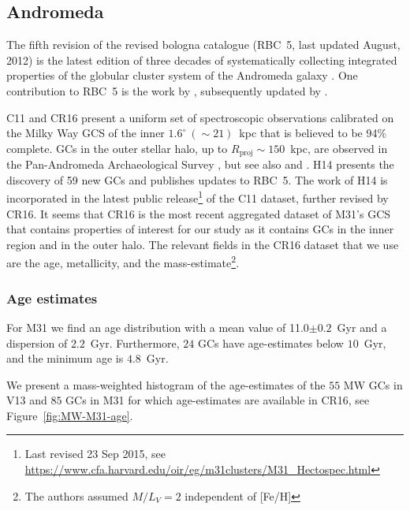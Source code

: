 \documentclass[a4paper,fleqn,usenatbib]{mnras}
\begin{document}
\subsection{Andromeda}
\label{sec:andromeda}
The fifth revision of the revised bologna catalogue (RBC~5, last updated
August, 2012) is the latest edition of three decades of systematically
collecting integrated properties of the globular cluster system of the
Andromeda galaxy \citep[][and references therein]{2004A&A...416..917G}. One
contribution to RBC~5 is the work by \citet[][hereafter C11]{2011AJ....141...61C},
subsequently updated by \citet[][hereafter CR16]{2016ApJ...824...42C}.

C11 and CR16 present a uniform set of spectroscopic observations calibrated
on the Milky Way GCS of the inner $1.6^\circ~(\sim21)$~kpc that
is believed to be 94\% complete. GCs in the outer stellar halo, up to
$R_{\text{proj}}\sim150$~kpc, are observed in the Pan-Andromeda Archaeological
Survey \citep[PAndAS, ][hereafter H14]{2014MNRAS.442.2165H}, but see also
\citet{2014MNRAS.442.2929V} and \citet{2019MNRAS.484.1756M}. H14 presents the
discovery of 59 new GCs and publishes updates to RBC~5. The work of H14 is
incorporated in the latest public release\footnote{Last revised 23 Sep 2015, see
\url{https://www.cfa.harvard.edu/oir/eg/m31clusters/M31_Hectospec.html}}
of the C11 dataset, further revised by CR16. It seems that CR16 is the most
recent aggregated dataset of M31's GCS that contains properties of interest
for our study as it contains GCs in the inner region and in the outer halo. The
relevant fields in the CR16 dataset that we use are the age, metallicity, and the
mass-estimate\footnote{The authors assumed $M/L_V = 2$ independent of [Fe/H]}.


\subsubsection{Age estimates}
For M31 we find an age distribution with a mean value of 11.0$\pm 0.2$~Gyr and a
dispersion of $2.2$~Gyr. Furthermore, $24$ GCs have age-estimates below $10$~Gyr, and
the minimum age is $4.8$~Gyr.

We present a mass-weighted histogram of the age-estimates of the $55$ MW GCs in V13
and $85$ GCs in M31 for which age-estimates are available in CR16, see
Figure~\ref{fig:MW-M31-age}.
\end{document}
